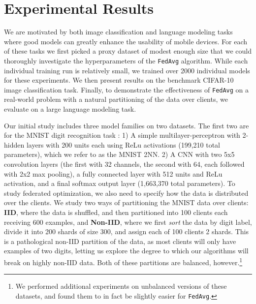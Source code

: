 \documentclass[twoside]{article}
\newcommand{\noaistats}[1]{}  %
\newcommand{\tnn}{2NN\xspace} %
\newcommand{\algfont}[1]{\texttt{#1}}
\newcommand{\fedavg}{\algfont{FedAvg}\xspace}
\newcommand{\fedavgshort}{\algfont{FedAvg}\xspace}
\begin{document}
\noaistats{The success of dropout training also provides some intuition for the
success of our model averaging scheme; dropout training can be
interpreted as averaging models of \emph{different} architectures
which share parameters, and the inference-time scaling of the model
parameters is analogous to the model averaging used in \fedavgshort
\citep{srivastava14dropout}.}


\section{Experimental Results} 
\label{sec:models} 
We are motivated by both image classification and language modeling
tasks where good models can greatly enhance the usability of mobile
devices. For each of these tasks we first picked a proxy dataset of
modest enough size that we could thoroughly investigate the
hyperparameters of the \fedavgshort algorithm.  While each individual
training run is relatively small, we trained over 2000 individual
models for these experiments. We then present results on the benchmark
CIFAR-10 image classification task. Finally, to demonstrate the
effectiveness of \fedavg on a real-world problem with a natural
partitioning of the data over clients, we evaluate on a large language
modeling task.

Our initial study includes three model families on two datasets. The
first two are for the MNIST digit recognition task
\citep{lecun98gradientbased}:
1) A simple multilayer-perceptron with 2-hidden layers with 200 units
each using ReLu activations (199,210 total parameters), which we refer
to as the MNIST \tnn.
2) A CNN with two 5x5 convolution layers (the first with 32 channels,
the second with 64, each followed with 2x2 max pooling), a fully
connected layer with 512 units and ReLu activation, and a final
softmax output layer (1,663,370 total parameters).
To study federated optimization, we also need to specify how the data
is distributed over the clients. We study two ways of partitioning the
MNIST data over clients: \textbf{IID}, where the data is shuffled, and then
partitioned into 100 clients each receiving 600 examples, and
\textbf{Non-IID}, where we first \emph{sort} the data by digit label,
divide it into 200 shards of size 300, and assign each of 100 clients
2 shards. This is a pathological non-IID partition of
the data, as most clients will only have examples of two
digits, letting us explore the degree to which our algorithms
will break on highly non-IID data. Both of these partitions are balanced, however.\footnote{We performed additional experiments on unbalanced versions of these datasets, and found them to in fact be slightly easier for \fedavg.}
\end{document}
